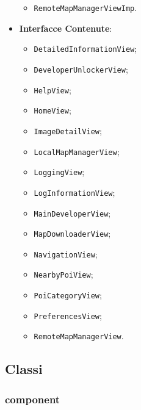 \documentclass[../DefinizioneDiProdotto.tex]{subfiles}
\begin{document}
\begin{itemize}
\begin{itemize}
		\item \texttt{RemoteMapManagerViewImp}.
		
	\end{itemize}
	\item \textbf{Interfacce Contenute}:
	\begin{itemize}
		\item \texttt{DetailedInformationView};
		
		\item \texttt{DeveloperUnlockerView};
		
		\item \texttt{HelpView};
		
		\item \texttt{HomeView};
		
		\item \texttt{ImageDetailView};
		
		\item \texttt{LocalMapManagerView};
		
		\item \texttt{LoggingView};
		
		\item \texttt{LogInformationView};
		
		\item \texttt{MainDeveloperView};
		
		\item \texttt{MapDownloaderView};
		
		\item \texttt{NavigationView};
		
		\item \texttt{NearbyPoiView};
		
		\item \texttt{PoiCategoryView};
		
		\item \texttt{PreferencesView};
		
		\item \texttt{RemoteMapManagerView}.
		
	\end{itemize}
\end{itemize}
\subsection{Classi}
\subsubsection{component}
\end{document}
